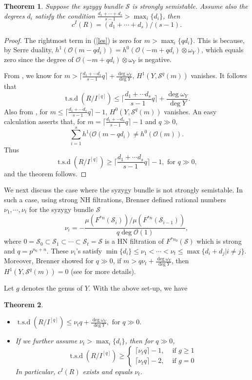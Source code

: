 \documentclass[draft]{amsart}
\newtheorem{theorem}{Theorem}[section]
\theoremstyle{definition}
\numberwithin{equation}{theorem}
\begin{document}
\begin{theorem} \label{SS}
Suppose the syzygy bundle ${\mathcal{S}}$ is strongly semistable. Assume also the degrees $d_i$ satisfy the condition $\frac{d_1+\cdots+d_s}{s-1} > \max_i\{d_i\}$, then 
\[c^I(R)= (d_1+\cdots + d_s)/(s-1).\]
\end{theorem}

\begin{proof}
The rightmost term in (\ref{les}) is zero for $m > \max_i\{qd_i\}$. 
This is because, by Serre duality,  $h^1({\mathcal{O}}(m-qd_i))=h^0({\mathcal{O}}(-m+qd_i)\otimes \omega_Y)$, which equals zero since the degree of 
${\mathcal{O}}(-m+qd_i)\otimes  \omega_Y$ is negative.

From \cite{B2}, we know for $m > {{\lceil}} \frac{d_1+ \cdots d_s}{s-1}q {{\rceil}} +\frac{\deg \omega_Y}{\deg Y}$, $ H^1(Y, {\mathcal{S}}^q(m))$ vanishes. It follows that 
\[{\operatorname{t.s.d}} (R/I^{[q]}) \leq {{\lceil}} \frac{d_1+ \cdots d_s}{s-1}q {{\rceil}} +\dfrac{\deg \omega_Y}{\deg Y}.\]
Also from \cite{B2}, for $m \leq {{\lceil}} \frac{d_1+ \cdots d_s}{s-1}q {{\rceil}} -1$,  $ H^0(Y, {\mathcal{S}}^q(m))$ vanishes. An easy calculation asserts that, for $m={{\lceil}} \frac{d_1+ \cdots d_s}{s-1}q {{\rceil}} -1$ and $q\gg0$,
\[\sum_{i=1}^s h^1({\mathcal{O}}(m-qd_i) \neq h^0({\mathcal{O}}(m)).\]
Thus 
\[{\operatorname{t.s.d}} (R/I^{[q]}) \geq {{\lceil}} \frac{d_1+ \cdots d_s}{s-1}q {{\rceil}}-1, \text{ for } q \gg0,\]
and the theorem follows.
\end{proof}

We next discuss the case where the syzygy bundle is not strongly semistable. In such a case, using strong NH filtrations, Brenner defined rational numbers $\nu_1, \cdots, \nu_t$ for the syzygy bundle ${\mathcal{S}}$
\[\nu_i=-\dfrac{\mu(F^{*n}({\mathcal{S}}_i))/\mu(F^{*n}({\mathcal{S}}_{i-1}))}{q\deg {\mathcal{O}}(1)},\]
where $0={\mathcal{S}}_0 \subset {\mathcal{S}}_1 \subset \cdots \subset {\mathcal{S}}_t={\mathcal{S}}$ is a HN filtration of $F^{*{n_0}}({\mathcal{S}})$ which is strong and $q=p^{n_0+n}$.
These $\nu_i$'s satisfy $\min\{d_i\} \leq \nu_1 < \cdots <\nu_t \leq \max \{d_i+d_j|i \neq j\}$. Moreover,
 Brenner showed for $q\gg0$, if $m>q\nu_t+\frac{\deg \omega_Y}{\deg Y}$, then $ H^1(Y, {\mathcal{S}}^q(m))=0$ (see \cite{B2} for more details).
 
Let $g$ denotes the genus of $Y$. With the above set-up, we have 
\begin{theorem}\label{NSS}
\begin{itemize}
 \item[(1)] ${\operatorname{t.s.d}} (R/I^{[q]}) \leq\nu_tq+\frac{\deg \omega_Y}{\deg Y}, \text{ for } q\gg0.$
 \item[(2)] If we further assume 
$\nu_t> \max_i\{d_i\}$,
then for $q\gg0$, 
\[ {\operatorname{t.s.d}} (R/I^{[q]}) \geq \begin{cases}
{{\lceil}}\nu_t q{{\rceil}}-1, & \text{ if } g \geq 1 \\
{{\lceil}}\nu_t q{{\rceil}}-2, & \text{ if } g=0
\end{cases}\]
In particular, $c^I(R)$ exists and equals $\nu_t$.
\end{itemize}
\end{theorem}
\end{document}
